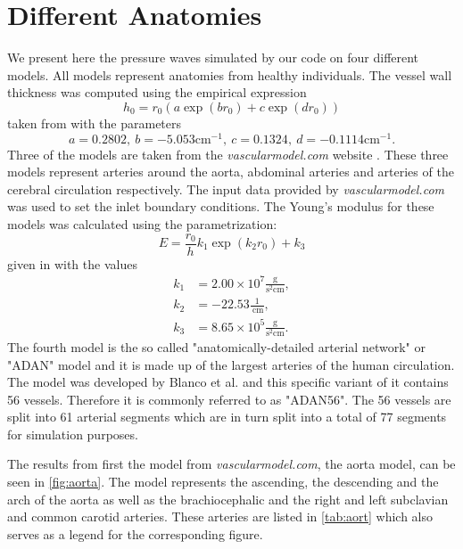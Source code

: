 \documentclass[a4paper, oneside]{discothesis}
\begin{document}
\section{Different Anatomies} \label{sec:da}
We present here the pressure waves simulated by our code on four different models.
All models represent anatomies from healthy individuals.
The vessel wall thickness was computed using the empirical expression
\begin{equation}
	h_0 = r_0 \left(a \exp(b r_0) + c \exp(d r_0)\right)
\end{equation}
taken from \cite{blanco2014anatomically} with the parameters
\begin{equation}
	a = 0.2802, \ b = -5.053 \text{cm}^{-1}, \ c = 0.1324,\  d = -0.1114 \text{cm}^{-1}.
\end{equation}
Three of the models are taken from the \emph{vascularmodel.com} website \cite{vascularmodel}.
These three models represent arteries around the aorta, abdominal arteries and arteries of the cerebral circulation respectively.
The input data provided by \emph{vascularmodel.com} was used to set the inlet boundary conditions.
The Young's modulus for these models was calculated using the parametrization:
\begin{equation}
	E = \frac{r_0}{h} k_1 \exp(k_2 r_0) + k_3
\end{equation}
given in \cite{ottesen2004applied} with the values
\begin{align}
	k_1 &= 2.00 \times 10^7 \frac{\text{g}}{\text{s}^2\text{cm}}, \\
	k_2 &= -22.53 \frac{1}{\ \text{cm}}, \\
	k_3 &= 8.65 \times 10^5 \frac{\text{g}}{\text{s}^2\text{cm}}.
\end{align}
The fourth model is the so called "anatomically-detailed arterial network" or "ADAN" model and it is made up of the largest arteries of the human circulation.
The model was developed by Blanco et al. \cite{blanco2014anatomically,blanco2014blood} and this specific variant of it contains 56 vessels.
Therefore it is commonly referred to as "ADAN56".
The 56 vessels are split into 61 arterial segments which are in turn split into a total of 77 segments for simulation purposes.

The results from first the model from \emph{vascularmodel.com}, the aorta model, can be seen in \autoref{fig:aorta}.
The model represents the ascending, the descending and the arch of the aorta as well as the brachiocephalic and the right and left subclavian and common carotid arteries.
These arteries are listed in \autoref{tab:aort} which also serves as a legend for the corresponding figure.
\end{document}
